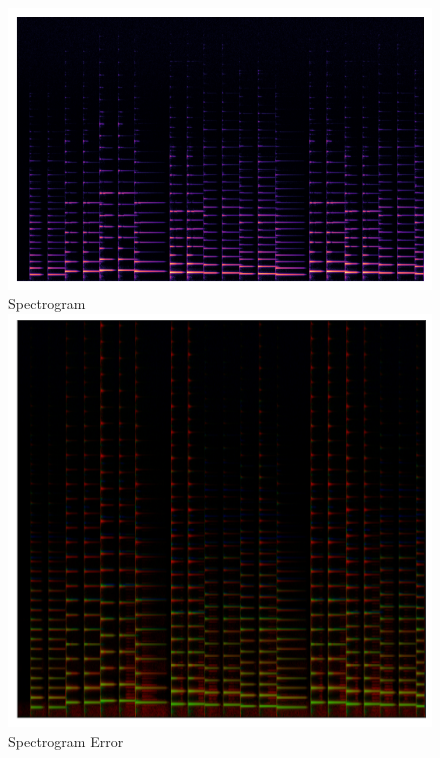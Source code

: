 \begin{figure}
    \begin{minipage}[b]{0.49\textwidth}
        \centering
        \includegraphics[width=\textwidth]{figures/fine-tuning/mel/spec.png}
        \small{\newline Spectrogram}
        \includegraphics[width=\textwidth]{figures/mss/piano-untuned-cycled.png}
        \small{\newline Spectrogram Error}
    \end{minipage}
    \hfill
    \begin{minipage}[b]{0.49\textwidth}

\end{minipage}
\end{figure}

